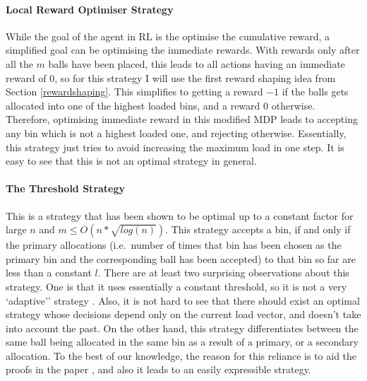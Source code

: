 \paragraph{Local Reward Optimiser Strategy}

While the goal of the agent in RL is the optimise the cumulative reward, a simplified goal can be optimising the immediate rewards. With rewards only after all the $m$ balls have been placed, this leads to all actions having an immediate reward of $0$, so for this strategy I will use the first reward shaping idea from Section \ref{rewardshaping}. This simplifies to getting a reward $-1$ if the balls gets allocated into one of the highest loaded bins, and a reward $0$ otherwise. Therefore, optimising immediate reward in this modified MDP leads to accepting any bin which is not a highest loaded one, and rejecting otherwise. Essentially, this strategy just tries to avoid increasing the maximum load in one step. It is easy to see that this is not an optimal strategy in general. 

\paragraph{The Threshold Strategy} 

This is a strategy that has been shown to be optimal  \cite{feldheim2021thinning} up to a constant factor for large $n$ and $m\leq O(n*\sqrt{log(n)})$. This strategy accepts a bin, if and only if the primary allocations (i.e.\ number of times that bin has been chosen as the primary bin and the corresponding ball has been accepted) to that bin so far are less than a constant $l$. There are at least two surprising observations about this strategy. One is that it uses essentially a constant threshold, so it is not a very `adaptive'' strategy . Also, it is not hard to see that there should exist an optimal strategy whose decisions depend only on the current load vector, and doesn't take into account the past. On the other hand, this strategy differentiates between the same ball being allocated in the same bin as a result of a primary, or a secondary allocation. To the best of our knowledge, the reason for this reliance is to aid the proofs in the paper \cite{feldheim2021thinning}, and also it leads to an easily expressible strategy. 

